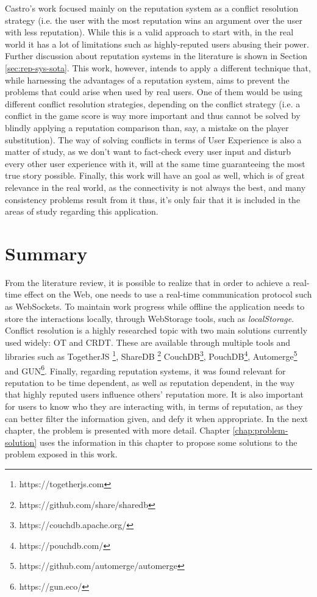 Castro's work focused mainly on the reputation system as a conflict resolution strategy (i.e. the user with the most reputation wins an argument over the user with less reputation). While this is a valid approach to start with, in the real world it has a lot of limitations such as highly-reputed users abusing their power. Further discussion about reputation systems in the literature is shown in Section \ref{sec:rep-sys-sota}. This work, however, intends to apply a different technique that, while harnessing the advantages of a reputation system, aims to prevent the problems that could arise when used by real users. One of them would be using different conflict resolution strategies, depending on the conflict strategy (i.e. a conflict in the game score is way more important and thus cannot be solved by blindly applying a reputation comparison than, say, a mistake on the player substitution). The way of solving conflicts in terms of User Experience is also a matter of study, as we don't want to fact-check every user input and disturb every other user experience with it, will at the same time guaranteeing the most true story possible. Finally, this work will have an  goal as well, which is of great relevance in the real world, as the connectivity is not always the best, and many consistency problems result from it thus, it's only fair that it is included in the areas of study regarding this application.

\section{Summary}

From the literature review, it is possible to realize that in order to achieve a real-time effect on the Web, one needs to use a real-time communication protocol such as WebSockets. To maintain work progress while offline the application needs to store the interactions locally, through WebStorage tools, such as \textit{localStorage}. Conflict resolution is a highly researched topic with two main solutions currently used widely: OT and CRDT. These are available through multiple tools and libraries such as TogetherJS \footnote{https://togetherjs.com}, ShareDB \footnote{https://github.com/share/sharedb} CouchDB\footnote{https://couchdb.apache.org/}, PouchDB\footnote{https://pouchdb.com/}, Automerge\footnote{https://github.com/automerge/automerge} and GUN\footnote{https://gun.eco/}. Finally, regarding reputation systems, it was found relevant for reputation to be time dependent, as well as reputation dependent, in the way that highly reputed users influence others' reputation more. It is also important for users to know who they are interacting with, in terms of reputation, as they can better filter the information given, and defy it when appropriate. In the next chapter, the problem is presented with more detail. Chapter \ref{chap:problem-solution} uses the information in this chapter to propose some solutions to the problem exposed in this work. 